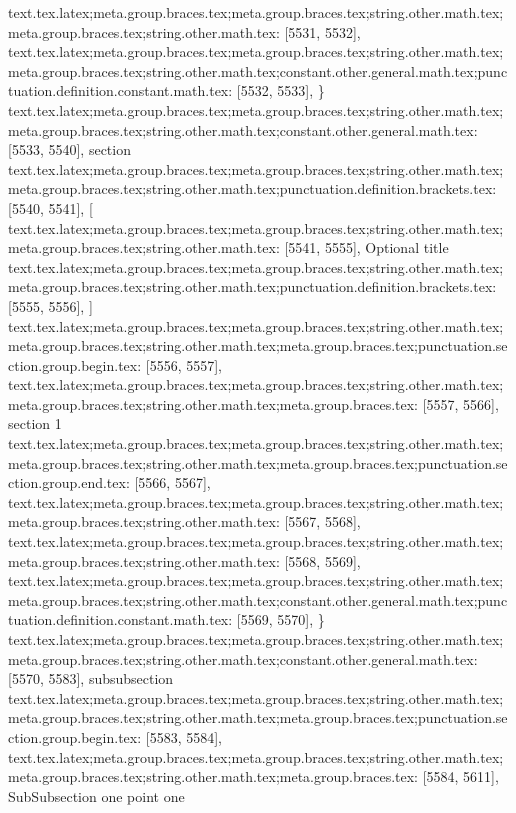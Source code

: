 {{{{{{{{{{{{{{{{{{{{{{{{{{{{{{{{{{{{{{{{{{{{{{{{{{{{{{{{{{{{{{{{{{{{{{{{{{{{{{{{{{{{{{{{{{{{{{{{{{{{{{{{{{{{{{{{{{{{{{{{{{{{{{{{{{{{{{{{{{{{{{{{{{{{{{{{}
text.tex.latex;meta.group.braces.tex;meta.group.braces.tex;string.other.math.tex;meta.group.braces.tex;string.other.math.tex: [5531, 5532], {
}
text.tex.latex;meta.group.braces.tex;meta.group.braces.tex;string.other.math.tex;meta.group.braces.tex;string.other.math.tex;constant.other.general.math.tex;punctuation.definition.constant.math.tex: [5532, 5533], {\}
text.tex.latex;meta.group.braces.tex;meta.group.braces.tex;string.other.math.tex;meta.group.braces.tex;string.other.math.tex;constant.other.general.math.tex: [5533, 5540], {section}
text.tex.latex;meta.group.braces.tex;meta.group.braces.tex;string.other.math.tex;meta.group.braces.tex;string.other.math.tex;punctuation.definition.brackets.tex: [5540, 5541], {[}
text.tex.latex;meta.group.braces.tex;meta.group.braces.tex;string.other.math.tex;meta.group.braces.tex;string.other.math.tex: [5541, 5555], {Optional title}
text.tex.latex;meta.group.braces.tex;meta.group.braces.tex;string.other.math.tex;meta.group.braces.tex;string.other.math.tex;punctuation.definition.brackets.tex: [5555, 5556], {]}
text.tex.latex;meta.group.braces.tex;meta.group.braces.tex;string.other.math.tex;meta.group.braces.tex;string.other.math.tex;meta.group.braces.tex;punctuation.section.group.begin.tex: [5556, 5557], {{}
text.tex.latex;meta.group.braces.tex;meta.group.braces.tex;string.other.math.tex;meta.group.braces.tex;string.other.math.tex;meta.group.braces.tex: [5557, 5566], {section 1}
text.tex.latex;meta.group.braces.tex;meta.group.braces.tex;string.other.math.tex;meta.group.braces.tex;string.other.math.tex;meta.group.braces.tex;punctuation.section.group.end.tex: [5566, 5567], {}}
text.tex.latex;meta.group.braces.tex;meta.group.braces.tex;string.other.math.tex;meta.group.braces.tex;string.other.math.tex: [5567, 5568], {
}
text.tex.latex;meta.group.braces.tex;meta.group.braces.tex;string.other.math.tex;meta.group.braces.tex;string.other.math.tex: [5568, 5569], {
}
text.tex.latex;meta.group.braces.tex;meta.group.braces.tex;string.other.math.tex;meta.group.braces.tex;string.other.math.tex;constant.other.general.math.tex;punctuation.definition.constant.math.tex: [5569, 5570], {\}
text.tex.latex;meta.group.braces.tex;meta.group.braces.tex;string.other.math.tex;meta.group.braces.tex;string.other.math.tex;constant.other.general.math.tex: [5570, 5583], {subsubsection}
text.tex.latex;meta.group.braces.tex;meta.group.braces.tex;string.other.math.tex;meta.group.braces.tex;string.other.math.tex;meta.group.braces.tex;punctuation.section.group.begin.tex: [5583, 5584], {{}
text.tex.latex;meta.group.braces.tex;meta.group.braces.tex;string.other.math.tex;meta.group.braces.tex;string.other.math.tex;meta.group.braces.tex: [5584, 5611], {SubSubsection one point one}
}}}}}}}}}}}}}}}}}}}}}}}}}}}}}}}}}}}}}}}}}}}}}}}}}}}}}}}}}}}}}}}}}}}}}}}}}}}}}}}}}}}}}}}}}}}}}}}}}}}}}}}}}}}}}}}}}}}}}}}}}}}}}}}}}}}}}}}}}}}}}}}}}}}}}}}}}}
